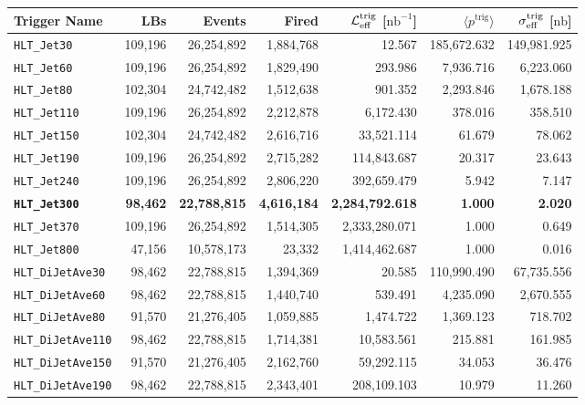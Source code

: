 \documentclass[aps,prd,twocolumn,preprintnumbers,nofootinbib,longbibliography,floatfix,superscriptaddress]{revtex4-1}
\begin{document}
\begin{table*}[t]
\begin{center}
\begin{tabular}{ l @{$\quad$}  r @{$\quad$} r @{$\quad$} r @{$\quad$} r @{$\quad$} r @{$\quad$} r @{$\quad$} }
\hline
\hline
Trigger Name & LBs & Events & Fired & $\mathcal{L}^\text{trig}_{\rm eff}$ [$\text{nb}^{-1}$] & $\langle p^\text{trig} \rangle$ & $\sigma^\text{trig}_{\rm eff}$ [$\text{nb}$] \\
\hline
\hline
\texttt{HLT\_Jet30} & 109,196 & 26,254,892 & 1,884,768 & 12.567 & 185,672.632 & 149,981.925 \\
\texttt{HLT\_Jet60} & 109,196 & 26,254,892 & 1,829,490 & 293.986 & 7,936.716 & 6,223.060 \\
\texttt{HLT\_Jet80} & 102,304 & 24,742,482 & 1,512,638 & 901.352 & 2,293.846 & 1,678.188 \\
\texttt{HLT\_Jet110} & 109,196 & 26,254,892 & 2,212,878 & 6,172.430 & 378.016 & 358.510 \\
\texttt{HLT\_Jet150} & 102,304 & 24,742,482 & 2,616,716 & 33,521.114 & 61.679 & 78.062 \\
\texttt{HLT\_Jet190} & 109,196 & 26,254,892 & 2,715,282 & 114,843.687 & 20.317 & 23.643 \\
\texttt{HLT\_Jet240} & 109,196 & 26,254,892 & 2,806,220 & 392,659.479 & 5.942 & 7.147 \\
\texttt{\textbf{HLT\_Jet300}} & \bf 98,462 & \bf 22,788,815 & \bf 4,616,184 & \bf 2,284,792.618 & \bf 1.000 & \bf 2.020 \\
\texttt{HLT\_Jet370} & 109,196 & 26,254,892 & 1,514,305 & 2,333,280.071 & 1.000 & 0.649 \\
\texttt{HLT\_Jet800} & 47,156 & 10,578,173 & 23,332 & 1,414,462.687 & 1.000 & 0.016 \\
\hline
\texttt{HLT\_DiJetAve30} & 98,462 & 22,788,815 & 1,394,369 & 20.585 & 110,990.490 & 67,735.556 \\
\texttt{HLT\_DiJetAve60} & 98,462 & 22,788,815 & 1,440,740 & 539.491 & 4,235.090 & 2,670.555 \\
\texttt{HLT\_DiJetAve80} & 91,570 & 21,276,405 & 1,059,885 & 1,474.722 & 1,369.123 & 718.702 \\
\texttt{HLT\_DiJetAve110} & 98,462 & 22,788,815 & 1,714,381 & 10,583.561 & 215.881 & 161.985 \\
\texttt{HLT\_DiJetAve150} & 91,570 & 21,276,405 & 2,162,760 & 59,292.115 & 34.053 & 36.476 \\
\texttt{HLT\_DiJetAve190} & 98,462 & 22,788,815 & 2,343,401 & 208,109.103 & 10.979 & 11.260 \\

\end{tabular}
\end{center}
\end{table*}
\end{document}
